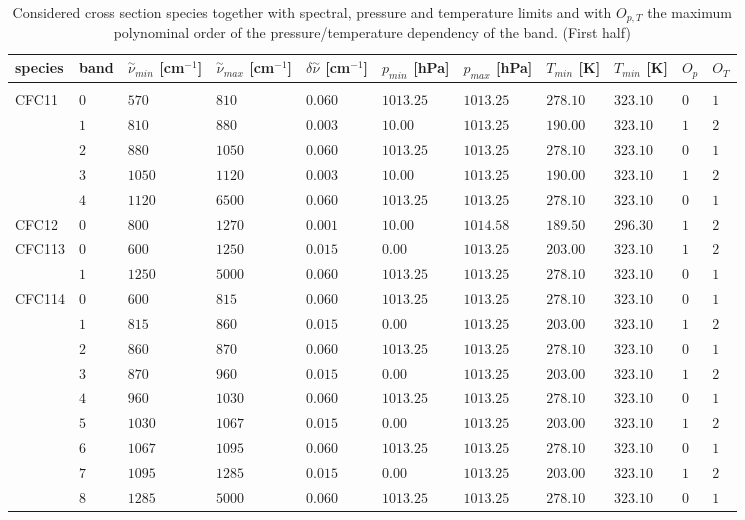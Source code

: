 \begin{table}
  \caption{Considered cross section species together
  with spectral, pressure and temperature limits and with $O_{p,T}$
  the maximum polynominal order of the pressure/temperature dependency
  of the band. (First half)}
\label{tab:abs_theory:Xsec_Absorption-species}
\scriptsize
\renewcommand{\arraystretch}{0.7}
\hspace{-2cm}
\begin{tabular}{lllllllllll}
\hline 
species & band & $\overset{\sim}{\nu}_{min}$ {[}cm$^{-1}${]} & $\overset{\sim}{\nu}_{max}$ {[}cm$^{-1}${]} & $\delta\overset{\sim}{\nu}$ {[}cm$^{-1}${]} & $p_{min}$ {[}hPa{]} & $p_{max}$ {[}hPa{]} & $T_{min}$ {[}K{]} & $T_{min}$ {[}K{]} & $O_{p}$ & $O_{T}$\tabularnewline
\hline 
&  &  &  &  &  &  &  &  &  & \tabularnewline
CFC11 & $0$ & $570$ & $810$ & $0.060$ & $1013.25$ & $1013.25$ & $278.10$ & $323.10$ & $0$ & $1$\tabularnewline
& $1$ & $810$ & $880$ & $0.003$ & $10.00$ & $1013.25$ & $190.00$ & $323.10$ & $1$ & $2$\tabularnewline
& $2$ & $880$ & $1050$ & $0.060$ & $1013.25$ & $1013.25$ & $278.10$ & $323.10$ & $0$ & $1$\tabularnewline
& $3$ & $1050$ & $1120$ & $0.003$ & $10.00$ & $1013.25$ & $190.00$ & $323.10$ & $1$ & $2$\tabularnewline
& $4$ & $1120$ & $6500$ & $0.060$ & $1013.25$ & $1013.25$ & $278.10$ & $323.10$ & $0$ & $1$\tabularnewline
CFC12 & $0$ & $800$ & $1270$ & $0.001$ & $10.00$ & $1014.58$ & $189.50$ & $296.30$ & $1$ & $2$\tabularnewline
CFC113 & $0$ & $600$ & $1250$ & $0.015$ & $0.00$ & $1013.25$ & $203.00$ & $323.10$ & $1$ & $2$\tabularnewline
& $1$ & $1250$ & $5000$ & $0.060$ & $1013.25$ & $1013.25$ & $278.10$ & $323.10$ & $0$ & $1$\tabularnewline
CFC114 & $0$ & $600$ & $815$ & $0.060$ & $1013.25$ & $1013.25$ & $278.10$ & $323.10$ & $0$ & $1$\tabularnewline
& $1$ & $815$ & $860$ & $0.015$ & $0.00$ & $1013.25$ & $203.00$ & $323.10$ & $1$ & $2$\tabularnewline
& $2$ & $860$ & $870$ & $0.060$ & $1013.25$ & $1013.25$ & $278.10$ & $323.10$ & $0$ & $1$\tabularnewline
& $3$ & $870$ & $960$ & $0.015$ & $0.00$ & $1013.25$ & $203.00$ & $323.10$ & $1$ & $2$\tabularnewline
& $4$ & $960$ & $1030$ & $0.060$ & $1013.25$ & $1013.25$ & $278.10$ & $323.10$ & $0$ & $1$\tabularnewline
& $5$ & $1030$ & $1067$ & $0.015$ & $0.00$ & $1013.25$ & $203.00$ & $323.10$ & $1$ & $2$\tabularnewline
& $6$ & $1067$ & $1095$ & $0.060$ & $1013.25$ & $1013.25$ & $278.10$ & $323.10$ & $0$ & $1$\tabularnewline
& $7$ & $1095$ & $1285$ & $0.015$ & $0.00$ & $1013.25$ & $203.00$ & $323.10$ & $1$ & $2$\tabularnewline
& $8$ & $1285$ & $5000$ & $0.060$ & $1013.25$ & $1013.25$ & $278.10$ & $323.10$ & $0$ & $1$\tabularnewline

\end{tabular}
\end{table}
